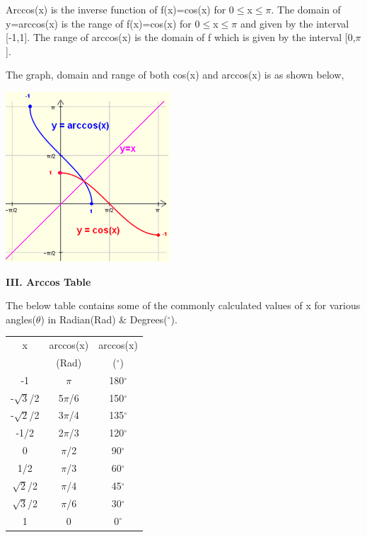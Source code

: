 \documentclass[12pt]{article}
\begin{document}
		Arccos(x) is the inverse function of f(x)=cos(x) for 0$\leq$x$\leq$$\pi$. The domain of y=arccos(x) is the range of f(x)=cos(x) for 0$\leq$x$\leq$$\pi$ and given by the interval [-1,1]. The range of arccos(x) is the domain of f which is given by the interval [0,$\pi$].\par
		The graph, domain and range of both cos(x) and arccos(x) is as shown below,
		\begin{center}
			\includegraphics[width=0.35\columnwidth]{pic2.png}
		\end{center}
\pagebreak	
\begin{flushleft}
	\Large\textbf{III. Arccos Table}
\end{flushleft}
The below table contains some of the commonly calculated values of	x for various angles($\theta$) in Radian(Rad) \& Degrees($^{\circ}$).
	\begin{center}
		\begin{tabular}{c|c|c}
			\hline
			x&arccos(x)&arccos(x)\\
			 &(Rad)&($^{\circ}$)\\
			 \hline
			 -1&$\pi$&180$^{\circ}$\\
			 \hline
			 -$\sqrt{3}$/2&5$\pi$/6&150$^{\circ}$\\
			 \hline
			 -$\sqrt{2}$/2&3$\pi$/4&135$^{\circ}$\\
			 \hline
			 -1/2&2$\pi$/3&120$^{\circ}$\\
			 \hline
			 0&$\pi$/2&90$^{\circ}$\\
			 \hline
			1/2&$\pi$/3&60$^{\circ}$\\
			 \hline
			 $\sqrt{2}$/2&$\pi$/4&45$^{\circ}$\\
			 \hline
			 $\sqrt{3}$/2&$\pi$/6&30$^{\circ}$\\
			 \hline
			 1&0&0$^{\circ}$\\
			 \hline
		\end{tabular}
	\end{center}
	
\end{document}
